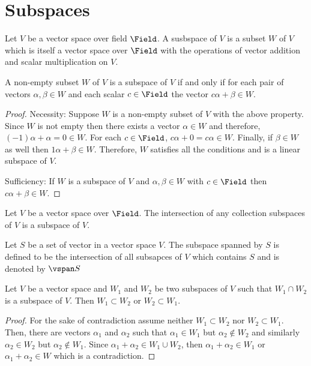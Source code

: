 \section{Subspaces}
Let \(V\) be a vector space over field \(\Field\). A susbspace of \(V\) is a subset \(W\) of \(V\) which is itself a vector space over \(\Field\) with the operations of vector addition and scalar multiplication on \(V\).

\begin{theorem}
    A non-empty subset \(W\) of \(V\) is a subspace of \(V\) if and only if for each pair of vectors \(\alpha, \beta \in W\) and each scalar \(c \in \Field\) the vector \(c\alpha + \beta \in W\).
\end{theorem}

\begin{proof}
    Necessity: Suppose \(W\) is a non-empty subset of \(V\) with the above property. Since \(W\) is not empty then there exists a vector \(\alpha \in W\) and therefore, \((-1) \alpha + \alpha = 0 \in W\). For each \(c \in \Field\), \(c\alpha + 0 = c\alpha \in W\). Finally, if \(\beta \in W\) as well then \(1 \alpha + \beta \in W\). Therefore, \(W\) satisfies all the conditions and is a linear subspace of \(V\).

    Sufficiency: If \(W\) is a subspace of \(V\) and \(\alpha, \beta \in W\) with \(c \in \Field\) then \(c\alpha + \beta \in W\).
\end{proof}

\begin{corollary}
    Let \(V\) be a vector space over \(\Field\). The intersection of any collection subspaces of \(V\) is a subspace of \(V\).
\end{corollary}

\begin{definition}
    Let \(S\) be a set of vector in a vector space \(V\). The subspace spanned by \(S\) is defined to be the intersection of all subsapces of \(V\) which contains \(S\) and is denoted by \(\vspan S\)
\end{definition}

\begin{theorem}
    Let \(V\) be a vector space and \(W_1\) and \(W_2\) be two subspaces of \(V\) such that \(W_1 \cap W_2\) is a subspace of \(V\). Then \(W_1 \subset W_2 \) or \(W_2 \subset W_1\).
\end{theorem}

\begin{proof}
    For the sake of contradiction assume neither \(W_1 \subset W_2\) nor \(W_2 \subset W_1\). Then, there are vectors \(\alpha_1\) and \(\alpha_2\) such that \(\alpha_1 \in W_1\) but \(\alpha_2 \notin W_2\) and similarly \(\alpha_2 \in W_2\) but \(\alpha_2 \notin W_1\). Since \(\alpha_1 + \alpha_2 \in W_1 \cup W_2\), then \(\alpha_1 + \alpha_2 \in W_1\) or \(\alpha_1 + \alpha_2 \in W\) which is a contradiction.
\end{proof}